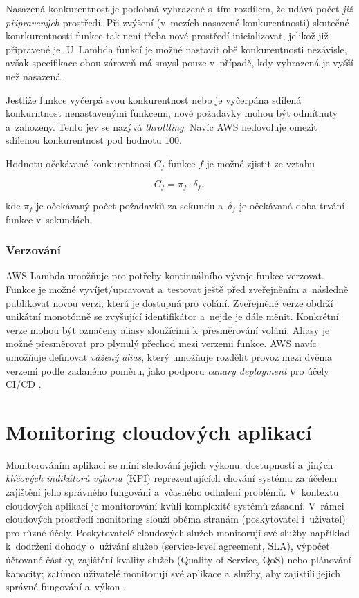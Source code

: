 \documentclass[czech, ing, kiv, he, iso690]{fasthesis}
\begin{document}
Nasazená konkurentnost je podobná vyhrazené s~tím rozdílem, že udává počet \emph{již připravených} prostředí. Při zvýšení (v~mezích nasazené konkurentnosti) skutečné konrkurentnosti funkce tak není třeba nové prostředí inicializovat, jelikož již připravené je. U~Lambda funkcí je možné nastavit obě konkurentnosti nezávisle, avšak specifikace obou zároveň má smysl pouze v~případě, kdy vyhrazená je vyšší než nasazená.

Jestliže funkce vyčerpá svou konkurentnost nebo je vyčerpána sdílená konkurntnost nenastavenými funkcemi, nové požadavky mohou být odmítnuty a~zahozeny. Tento jev se nazývá \emph{throttling}. Navíc AWS nedovoluje omezit sdílenou konkurentnost pod hodnotu 100.

Hodnotu očekávané konkurentnosi $C_f$ funkce $f$ je možné zjistit ze vztahu

$$C_f = \pi_f \cdot \delta_f, $$

kde $\pi_f$ je očekávaný počet požadavků za sekundu a~$\delta_f$ je očekávaná doba trvání funkce v~sekundách. 

\subsubsection{Verzování}
AWS Lambda umožňuje pro potřeby kontinuálního vývoje funkce verzovat. Funkce je možné vyvíjet/upravovat a~testovat ještě před zveřejněním a~následně publikovat novou verzi, která je dostupná pro volání. Zveřejněné verze obdrží unikátní monotónně se zvyšující identifikátor a~nejde je dále měnit. Konkrétní verze mohou být označeny aliasy sloužícími k~přesměrování volání. Aliasy je možné přesměrovat pro plynulý přechod mezi verzemi funkce. AWS navíc umožňuje definovat \emph{vážený alias}, který umožňuje rozdělit provoz mezi dvěma verzemi podle zadaného poměru, jako podporu \emph{canary deployment} pro účely CI/CD \cite{lambda.docs.aws}.



\section{Monitoring cloudových aplikací}

Monitorováním aplikací se míní sledování jejich výkonu, dostupnosti a~jiných \emph{klíčových indikátorů výkonu} (KPI) reprezentujících chování systému za účelem zajištění jeho správného fungování a~včasného odhalení problémů. V~kontextu cloudových aplikací je monitorování kvůli komplexitě systémů zásadní. V~rámci cloudových prostředí monitoring slouží oběma stranám (poskytovatel i~uživatel) pro různé účely. Poskytovatelé cloudových služeb monitorují své služby například k~dodržení dohody o~užívání služeb (service-level agreement, SLA), výpočet účtované částky, zajištění kvality služeb (Quality of Service, QoS) nebo plánování kapacity; zatímco uživatelé monitorují své aplikace a~služby, aby zajistili jejich správné fungování a~výkon \cite{cloud_mon_basics, cloud_mon_aceto2}.
\end{document}
